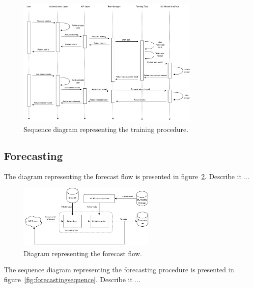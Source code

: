 \begin{figure}[H]
\centering 
\includegraphics[width=0.8\textwidth]{images/architecture_training_sequence}
\caption{Sequence diagram representing the training procedure.}
\label{fig:trainingsequence}
\end{figure}


\vspace{0.1 cm}
\subsection{Forecasting}
\label{sec:loading}
\vspace{0.1 cm}

The diagram representing the forecast flow is presented in figure~\ref{fig:forecastflow}.
Describe it ...

\begin{figure}[H]
\centering 
\includegraphics[width=0.6\textwidth]{images/architecture_forecast_flow}
\caption{Diagram representing the forecast flow.}
\label{fig:forecastflow}
\end{figure}

The sequence diagram representing the forecasting procedure is presented in figure~\ref{fig:forecastingsequence}.
Describe it ...


